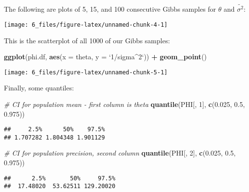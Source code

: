 \documentclass[]{article}
\newenvironment{Shaded}{\begin{snugshade}}{\end{snugshade}}
\newcommand{\CommentTok}[1]{\textcolor[rgb]{0.56,0.35,0.01}{\textit{#1}}}
\newcommand{\DataTypeTok}[1]{\textcolor[rgb]{0.13,0.29,0.53}{#1}}
\newcommand{\DecValTok}[1]{\textcolor[rgb]{0.00,0.00,0.81}{#1}}
\newcommand{\FloatTok}[1]{\textcolor[rgb]{0.00,0.00,0.81}{#1}}
\newcommand{\KeywordTok}[1]{\textcolor[rgb]{0.13,0.29,0.53}{\textbf{#1}}}
\newcommand{\NormalTok}[1]{#1}
\newcommand{\OperatorTok}[1]{\textcolor[rgb]{0.81,0.36,0.00}{\textbf{#1}}}
\newcommand{\StringTok}[1]{\textcolor[rgb]{0.31,0.60,0.02}{#1}}
\begin{document}
The following are plots of 5, 15, and 100 consecutive Gibbs samples for
\(\theta\) and \(\tilde{\sigma^2}\):

\begin{center}\texttt{[image: 6\_files/figure-latex/unnamed-chunk-4-1]} \end{center}

This is the scatterplot of all 1000 of our Gibbs samples:

\begin{Shaded}
\begin{Highlighting}[]
\KeywordTok{ggplot}\NormalTok{(phi.df, }\KeywordTok{aes}\NormalTok{(}\DataTypeTok{x =}\NormalTok{ theta, }\DataTypeTok{y =} \StringTok{`}\DataTypeTok{1/sigma^2}\StringTok{`}\NormalTok{)) }\OperatorTok{+}\StringTok{ }\KeywordTok{geom_point}\NormalTok{()}
\end{Highlighting}
\end{Shaded}

\begin{center}\texttt{[image: 6\_files/figure-latex/unnamed-chunk-5-1]} \end{center}

Finally, some quantiles:

\begin{Shaded}
\begin{Highlighting}[]
\CommentTok{# CI for population mean - first column is theta}
\KeywordTok{quantile}\NormalTok{(PHI[, }\DecValTok{1}\NormalTok{], }\KeywordTok{c}\NormalTok{(}\FloatTok{0.025}\NormalTok{, }\FloatTok{0.5}\NormalTok{, }\FloatTok{0.975}\NormalTok{))}
\end{Highlighting}
\end{Shaded}

\begin{verbatim}
##     2.5%      50%    97.5% 
## 1.707282 1.804348 1.901129
\end{verbatim}

\begin{Shaded}
\begin{Highlighting}[]
\CommentTok{# CI for population precision, second column}
\KeywordTok{quantile}\NormalTok{(PHI[, }\DecValTok{2}\NormalTok{], }\KeywordTok{c}\NormalTok{(}\FloatTok{0.025}\NormalTok{, }\FloatTok{0.5}\NormalTok{, }\FloatTok{0.975}\NormalTok{))}
\end{Highlighting}
\end{Shaded}

\begin{verbatim}
##      2.5%       50%     97.5% 
##  17.48020  53.62511 129.20020
\end{verbatim}
\end{document}
